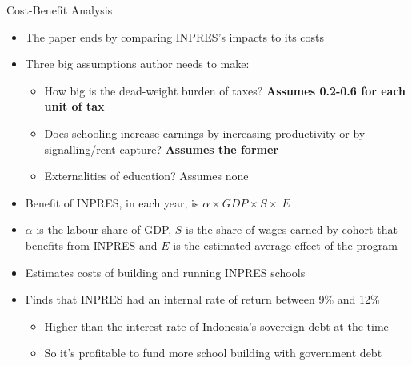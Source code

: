 \documentclass[11pt,notes=hide,aspectratio=169,mathserif]{beamer}
\begin{document}
\begin{frame}{Cost-Benefit Analysis}
\begin{itemize}
\item The paper ends by comparing INPRES's impacts to its costs
\item Three big assumptions author needs to make:
\begin{itemize}
    \item  How big is the dead-weight burden of taxes?  \textbf{Assumes 0.2-0.6 for each unit of tax}
    \item  Does schooling increase earnings by increasing productivity or by signalling/rent capture?  \textbf{Assumes the former}
    \item  Externalities of education? Assumes none
\end{itemize}
\item  Benefit of INPRES, in each year, is $\alpha\times GDP \times S\times\ E$
\item $\alpha$ is the labour share of GDP, $S$ is the share of wages earned by cohort that benefits from INPRES and $E$ is the estimated average effect of the program
\item  Estimates costs of building and running INPRES schools
\item  Finds that INPRES had an internal rate of return between 9\% and 12\%
\begin{itemize}
    \item Higher than the interest rate of Indonesia's sovereign debt at the time
    \item So it's profitable to fund more school building with government debt
\end{itemize}
\end{itemize}
\end{frame}
\end{document}
